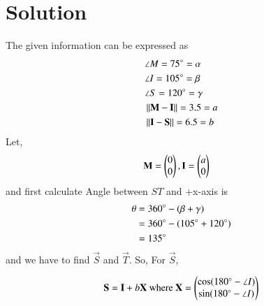 \documentclass[journal,12pt,twocolumn]{IEEEtran}
\begin{document}
\section{Solution}
The given information can be expressed as
    \begin{align}
    &\angle M = 75\degree = \alpha \label{eq 1}
    \\
    &\angle I = 105\degree = \beta \label{eq 2}
    \\
    &\angle S = 120\degree = \gamma \label{eq 3}
    \\
    &\left\lVert\mathbf{M}-\mathbf{I}\right\rVert = 3.5 = a \label{eq 4}
    \\
    &\left\lVert\mathbf{I}-\mathbf{S}\right\rVert = 6.5 = b \label{eq 5}
    \end{align}
Let, 
\begin{align}
&\mathbf{M}=\begin{pmatrix}0\\0\end{pmatrix},\mathbf{I}=\begin{pmatrix}a\\0\end{pmatrix}
\end{align}
and first calculate Angle between $ST$ and +x-axis is
\begin{align}
\theta &= 360\degree - (\beta + \gamma)\\
       &= 360\degree - (105\degree + 120\degree)\\
       &= 135\degree \label{eq a}
\end{align}
and we have to find $\vec{S}$ and $\vec{T}$.
So, For $\vec{S}$, 
\begin{lemma}
\begin{align}
\mathbf{S} =\mathbf{I} + b\mathbf{X} \text{ where } \mathbf{X} = \begin{pmatrix}\cos (180\degree -\angle I)\\\sin (180\degree -\angle I)\end{pmatrix} \label{eq b}
\end{align}
\end{lemma}
\end{document}
